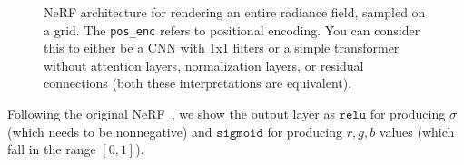 \begin{figure}
{
    }
    \caption{NeRF architecture for rendering an entire radiance field, sampled on a grid. The \texttt{pos\_enc} refers to positional encoding. You can consider this to either be a CNN with 1x1 filters or a simple transformer without attention layers, normalization layers, or residual connections (both these interpretations are equivalent).}
    \label{fig:nerfs:image_to_image_arch}
\end{figure}

Following the original NeRF~\cite{mildenhall2020nerf}, we show the output layer as $\texttt{relu}$ for producing $\sigma$ (which needs to be nonnegative) and $\texttt{sigmoid}$ for producing $r,g,b$ values (which fall in the range $[0,1]$).


